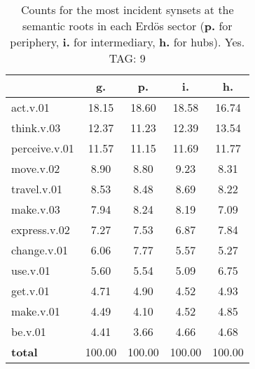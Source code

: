 \begin{table}[h!]
\begin{center}
\begin{tabular}{| l || c | c | c | c |}\hline
 & {\bf g.} & {\bf p.} & {\bf i.} & {\bf h.} \\\hline\hline
act.v.01 & 18.15  & 18.60  & 18.58  & 16.74 \\\hline
think.v.03 & 12.37  & 11.23  & 12.39  & 13.54 \\\hline
perceive.v.01 & 11.57  & 11.15  & 11.69  & 11.77 \\\hline
move.v.02 & 8.90  & 8.80  & 9.23  & 8.31 \\\hline
travel.v.01 & 8.53  & 8.48  & 8.69  & 8.22 \\\hline
make.v.03 & 7.94  & 8.24  & 8.19  & 7.09 \\\hline
express.v.02 & 7.27  & 7.53  & 6.87  & 7.84 \\\hline
change.v.01 & 6.06  & 7.77  & 5.57  & 5.27 \\\hline
use.v.01 & 5.60  & 5.54  & 5.09  & 6.75 \\\hline
get.v.01 & 4.71  & 4.90  & 4.52  & 4.93 \\\hline
make.v.01 & 4.49  & 4.10  & 4.52  & 4.85 \\\hline
be.v.01 & 4.41  & 3.66  & 4.66  & 4.68 \\\hline\hline
{{\bf total}} & 100.00  & 100.00  & 100.00  & 100.00 \\\hline
\end{tabular}
\caption{Counts for the most incident synsets at the semantic roots in each Erd\"os sector ({\bf p.} for periphery, {\bf i.} for intermediary, {\bf h.} for hubs). Yes. TAG: 9}
\end{center}
\end{table}